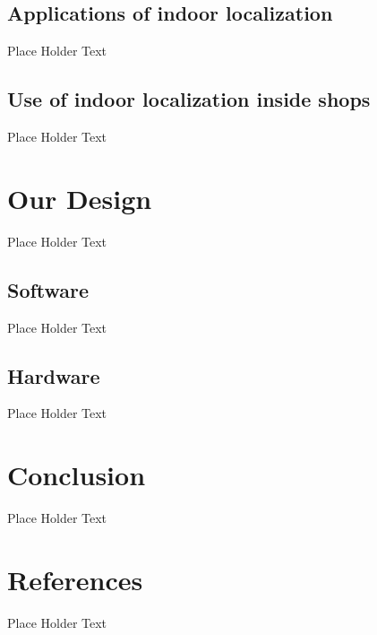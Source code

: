 \documentclass{article}
\begin{document}
\subsection{Applications of indoor localization}
Place Holder Text

\subsection{Use of indoor localization inside shops}
Place Holder Text

\section{Our Design}
Place Holder Text

\subsection{Software}
Place Holder Text

\subsection{Hardware}
Place Holder Text

\section{Conclusion}
Place Holder Text

\section{References}
Place Holder Text
\end{document}

